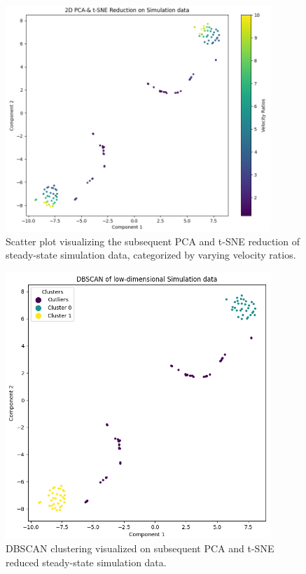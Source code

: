 \begin{figure}[ht]
\centering
\includegraphics[width=10cm]{images/Clustering/pca_tsne_sim_cmap.png}
\caption{Scatter plot visualizing the subsequent PCA and t-SNE reduction of steady-state simulation data, categorized by varying velocity ratios. }
\label{pcatsnesim}
\end{figure}
\begin{figure}[ht]
    \centering
    \includegraphics[width=10cm]{images/Clustering/dbscan_tsne_pca_sim.png}
    \caption{DBSCAN clustering visualized on subsequent PCA and t-SNE reduced steady-state simulation data.}
    \label{dbscanpcatsne}
    \end{figure}

